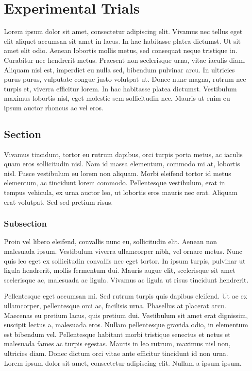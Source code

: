 \chapter{Experimental Trials}
\label{chapter4}

Lorem ipsum dolor sit amet, consectetur adipiscing elit. Vivamus nec tellus eget elit aliquet accumsan sit amet in lacus. In hac habitasse platea dictumst. Ut sit amet elit odio. Aenean lobortis mollis metus, sed consequat neque tristique in. Curabitur nec hendrerit metus. Praesent non scelerisque urna, vitae iaculis diam. Aliquam nisl est, imperdiet eu nulla sed, bibendum pulvinar arcu. In ultricies purus purus, vulputate congue justo volutpat ut. Donec nunc magna, rutrum nec turpis et, viverra efficitur lorem. In hac habitasse platea dictumst. Vestibulum maximus lobortis nisl, eget molestie sem sollicitudin nec. Mauris ut enim eu ipsum auctor rhoncus ac vel eros.

\section{Section}
Vivamus tincidunt, tortor eu rutrum dapibus, orci turpis porta metus, ac iaculis quam eros sollicitudin nisl. Nam id massa elementum, commodo mi at, lobortis nisl. Fusce vestibulum eu lorem non aliquam. Morbi eleifend tortor id metus elementum, ac tincidunt lorem commodo. Pellentesque vestibulum, erat in tempus vehicula, ex urna auctor leo, ut lobortis eros mauris nec erat. Aliquam erat volutpat. Sed sed pretium risus.

\subsection{Subsection}
Proin vel libero eleifend, convallis nunc eu, sollicitudin elit. Aenean non malesuada ipsum. Vestibulum viverra ullamcorper nibh, vel ornare metus. Nunc quis leo eget ex sollicitudin convallis nec \cite{Maeda1999} eget tortor. In ipsum turpis, pulvinar ut ligula hendrerit, mollis fermentum dui. Mauris augue elit, scelerisque sit amet scelerisque ac, malesuada ac ligula. Vivamus ac ligula ut risus tincidunt hendrerit.

Pellentesque eget accumsan mi. Sed rutrum turpis quis dapibus eleifend. Ut ac ex ullamcorper, pellentesque orci ac, facilisis urna. Phasellus at placerat arcu. Maecenas eu pretium lacus, quis pretium dui. Vestibulum sit amet erat dignissim, suscipit lectus a, malesuada eros. Nullam pellentesque gravida odio, in elementum est bibendum vel. Pellentesque habitant morbi tristique senectus et netus et malesuada fames ac turpis egestas. Mauris in leo rutrum, maximus nisl non, ultricies diam. Donec dictum orci vitae ante efficitur tincidunt id non urna. Lorem ipsum dolor sit amet, consectetur adipiscing elit. Nullam a ipsum ipsum.